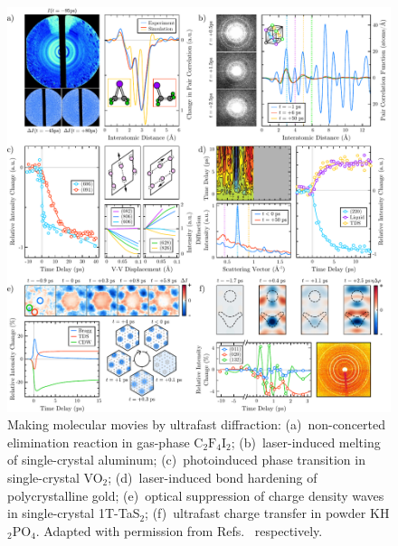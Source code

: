 \begin{figure}[ht!]
  \centering
  \includegraphics[width = \textwidth]{Figures/fig_intro_data.pdf}
  \caption[Making molecular movies by ultrafast diffraction.]{
    Making molecular movies by ultrafast diffraction:
    (a)~non-concerted elimination reaction in gas-phase $\mathrm{C_2 F_4 I_2}$;
    (b)~laser-induced melting of single-crystal aluminum;
    (c)~photoinduced phase transition in single-crystal {VO$_2$};
    (d)~laser-induced bond hardening of polycrystalline gold;
    (e)~optical suppression of charge density waves in single-crystal {1T-TaS$_2$};
    (f)~ultrafast charge transfer in powder KH$_2$PO$_4$.
    Adapted with permission from Refs.~\cite{Ihee2001, Siwick2003, Baum2007,
    Ernstorfer2009, Eichberger2010, Zamponi2012} respectively.
  }
  \label{fig: intro-data}
\end{figure}

